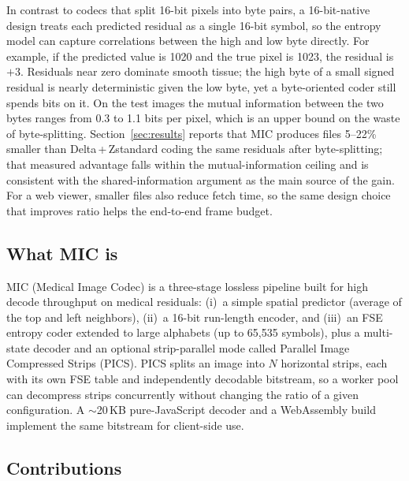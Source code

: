\documentclass[journal]{IEEEtran}
\begin{document}
In contrast to codecs that split 16-bit pixels into byte pairs, a 16-bit-native
design treats each predicted residual as a single 16-bit symbol, so the entropy
model can capture correlations between the high and low byte directly. For
example, if the predicted value is 1020 and the true pixel is 1023, the residual
is $+3$. Residuals near zero dominate smooth tissue; the high byte of a small
signed residual is nearly deterministic given the low byte, yet a byte-oriented
coder still spends bits on it. On the test images the mutual information between
the two bytes ranges from 0.3 to 1.1 bits per pixel, which is an upper bound on
the waste of byte-splitting. Section~\ref{sec:results} reports that MIC produces
files 5--22\% smaller than Delta\,+\,Zstandard coding the same residuals after
byte-splitting; that measured advantage falls within the mutual-information
ceiling and is consistent with the shared-information argument as the main
source of the gain. For a web viewer, smaller files also reduce fetch time, so
the same design choice that improves ratio helps the end-to-end frame budget.

\subsection{What MIC is}

MIC (Medical Image Codec) is a three-stage lossless pipeline built for high
decode throughput on medical residuals: (i)~a simple spatial predictor (average
of the top and left neighbors), (ii)~a 16-bit run-length encoder, and (iii)~an
FSE entropy coder extended to large alphabets (up to 65,535 symbols), plus a
multi-state decoder and an optional strip-parallel mode called Parallel Image
Compressed Strips (PICS). PICS splits an image into $N$ horizontal strips, each
with its own FSE table and independently decodable bitstream, so a worker pool
can decompress strips concurrently without changing the ratio of a given
configuration. A ${\sim}$20\,KB pure-JavaScript decoder and a WebAssembly build
implement the same bitstream for client-side use.

\subsection{Contributions}
\end{document}
